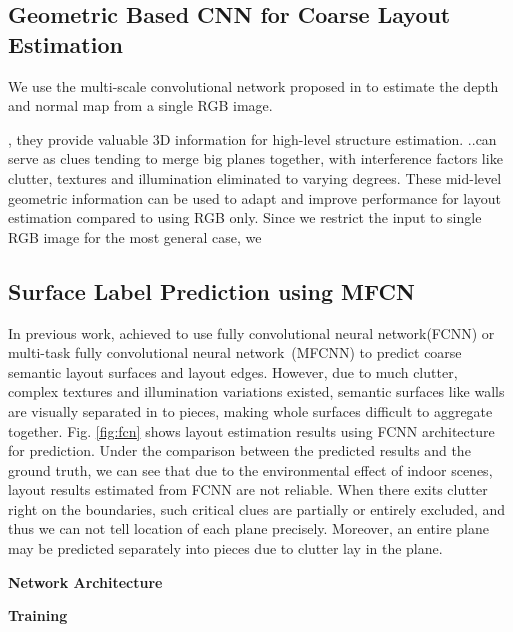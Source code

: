 \subsection{Geometric Based CNN for Coarse Layout Estimation}
\label{sec:depth_normal}

We use the multi-scale convolutional network proposed in \cite{eigen2015predicting} to estimate the depth and normal map from a single RGB image. 
%


, they provide valuable 3D information for high-level structure estimation.
..can serve as clues tending to merge big planes together, with interference factors like clutter, textures and illumination eliminated to varying degrees. 
%
These mid-level geometric information can be used to adapt and improve performance for layout estimation compared to using RGB only. 
%
Since we restrict the input to single RGB image for the most general case, we 

 


\subsection{Surface Label Prediction using MFCN}
\label{sec:surfacelabel}
%
In previous work, \cite{dasgupta2016delay,ren2016coarse} achieved to use fully convolutional neural network(FCNN) or multi-task fully convolutional neural network~(MFCNN) to predict coarse semantic layout surfaces and layout edges. 
%
However, due to much clutter, complex textures and illumination variations existed, semantic surfaces like walls are visually separated in to pieces, making whole surfaces difficult to aggregate together. 
%
Fig. \ref{fig:fcn} shows layout estimation results using FCNN architecture for prediction. Under the comparison between the predicted results and the ground truth, we can see that due to the environmental effect of indoor scenes, layout results estimated from FCNN are not reliable. When there exits clutter right on the boundaries, such critical clues are partially or entirely excluded, and thus we can not tell location of each plane precisely. 
Moreover, an entire plane may be predicted separately into pieces due to clutter lay in the plane.

\textbf{Network Architecture}


\textbf{Training}

